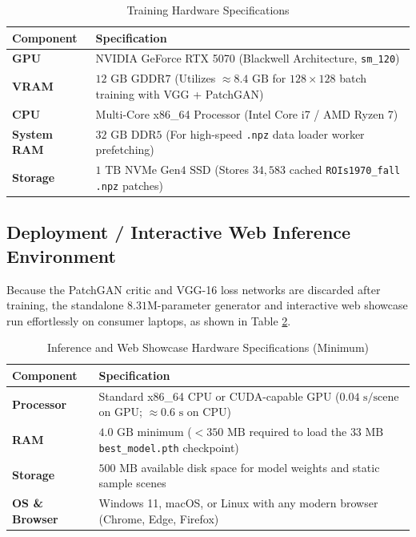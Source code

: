 \documentclass[12pt,a4paper]{report}
\begin{document}
\begin{table}[htbp]
\centering
\caption{Training Hardware Specifications}
\label{tab:train_hw}
\renewcommand{\arraystretch}{1.25}
\begin{tabular}{|p{3.2cm}|p{10.8cm}|}
\hline
\textbf{Component} & \textbf{Specification} \\
\hline
\textbf{GPU} & NVIDIA GeForce RTX 5070 (Blackwell Architecture, \texttt{sm\_120}) \\
\textbf{VRAM} & $12\text{ GB GDDR7}$ (Utilizes $\approx 8.4\text{ GB}$ for $128\times 128$ batch training with VGG + PatchGAN) \\
\textbf{CPU} & Multi-Core x86\_64 Processor (Intel Core i7 / AMD Ryzen 7) \\
\textbf{System RAM} & $32\text{ GB DDR5}$ (For high-speed \texttt{.npz} data loader worker prefetching) \\
\textbf{Storage} & $1\text{ TB NVMe Gen4 SSD}$ (Stores $34{,}583$ cached \texttt{ROIs1970\_fall} \texttt{.npz} patches) \\
\hline
\end{tabular}
\end{table}

\subsection{Deployment / Interactive Web Inference Environment}
Because the PatchGAN critic and VGG-16 loss networks are discarded after training, the standalone $8.31\text{M}$-parameter generator and interactive web showcase run effortlessly on consumer laptops, as shown in Table \ref{tab:inf_hw}.

\begin{table}[htbp]
\centering
\caption{Inference and Web Showcase Hardware Specifications (Minimum)}
\label{tab:inf_hw}
\renewcommand{\arraystretch}{1.25}
\begin{tabular}{|p{3.2cm}|p{10.8cm}|}
\hline
\textbf{Component} & \textbf{Specification} \\
\hline
\textbf{Processor} & Standard x86\_64 CPU or CUDA-capable GPU ($0.04\text{ s/scene}$ on GPU; $\approx 0.6\text{ s}$ on CPU) \\
\textbf{RAM} & $4.0\text{ GB}$ minimum ($< 350\text{ MB}$ required to load the $33\text{ MB}$ \texttt{best\_model.pth} checkpoint) \\
\textbf{Storage} & $500\text{ MB}$ available disk space for model weights and static sample scenes \\
\textbf{OS \& Browser} & Windows 11, macOS, or Linux with any modern browser (Chrome, Edge, Firefox) \\
\hline
\end{tabular}
\end{table}
\end{document}
